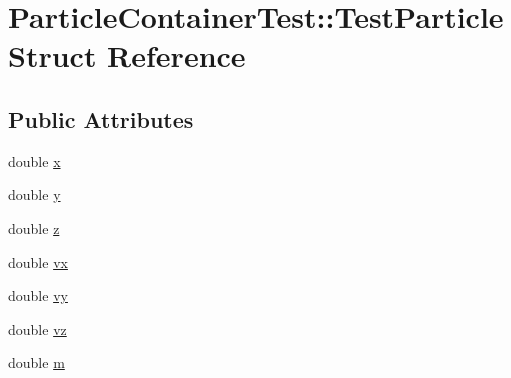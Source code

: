 \hypertarget{structParticleContainerTest_1_1TestParticle}{\section{Particle\-Container\-Test\-:\-:Test\-Particle Struct Reference}
\label{structParticleContainerTest_1_1TestParticle}
}
\subsection*{Public Attributes}
\begin{DoxyCompactItemize}
\item 
double \hyperlink{structParticleContainerTest_1_1TestParticle_add0472ca8a31ba4630b5470fc710fd37}{x}
\item 
double \hyperlink{structParticleContainerTest_1_1TestParticle_af27fbca6e49c80bd1b8555df0e7b1380}{y}
\item 
double \hyperlink{structParticleContainerTest_1_1TestParticle_a0d9bef972bdcf0fc2465aa2a4d124033}{z}
\item 
double \hyperlink{structParticleContainerTest_1_1TestParticle_aa99b7d2fe342a22534ce92585441bbd3}{vx}
\item 
double \hyperlink{structParticleContainerTest_1_1TestParticle_aa0f006f1d60465699bdb74f5716cd1f2}{vy}
\item 
double \hyperlink{structParticleContainerTest_1_1TestParticle_a262ea711c8f55a21404fa62401933c6b}{vz}
\item 
double \hyperlink{structParticleContainerTest_1_1TestParticle_af110e6ebdcce198c96cf93cce206dd6c}{m}
\end{DoxyCompactItemize}


